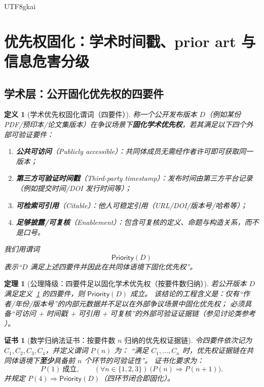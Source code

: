 \documentclass[12pt]{article}
\newtheorem{definition}{定义}[section]
\newtheorem{theorem}{定理}[section]
\newtheorem{Certificate}{证书}[section]
\begin{document}
\begin{CJK*}{UTF8}{gkai}
\section{优先权固化：学术时间戳、prior art 与信息危害分级}
\label{sec:priority-ip-infohazard}

\subsection{学术层：公开固化优先权的四要件}
\label{sec:priority-academic}

\begin{definition}[学术优先权固化谓词（四要件）]
\label{def:priority-four-conditions}
称一个公开发布版本 $D$（例如某份 PDF/预印本/论文集版本）在争议场景下\textbf{固化学术优先权}，若其满足以下四个外部可验证要件：
\begin{enumerate}
  \item \textbf{公共可访问}（Publicly accessible）：共同体成员无需经作者许可即可获取同一版本；
  \item \textbf{第三方可验证时间戳}（Third-party timestamp）：发布时间由第三方平台记录（例如提交时间/DOI 发行时间等）；
  \item \textbf{可检索可引用}（Citable）：他人可稳定引用（URL/DOI/版本号/哈希等）；
  \item \textbf{足够披露/可复核}（Enablement）：包含可复核的定义、命题与构造关系，而不是口号。
\end{enumerate}
我们用谓词
\[
  \mathsf{Priority}(D)
\]
表示“$D$ 满足上述四要件并因此在共同体语境下固化优先权”。
\end{definition}

\begin{theorem}[公理降级：四要件足以固化学术优先权（按要件数归纳）]
\label{thm:priority-four-conditions-sufficient}
若公开版本 $D$ 满足定义~\ref{def:priority-four-conditions} 的四要件，则 $\mathsf{Priority}(D)$ 成立。
该结论的工程含义是：仅有“作者/年份/版本号”的内部元数据并不足以在外部争议场景中固化优先权；
必须具备“可访问 + 时间戳 + 可引用 + 可复核”的外部可验证证据链（参见讨论类参考 \cite{ref_academia_priority}）。
\end{theorem}

\begin{Certificate}[数学归纳法证书：按要件数 $n$ 归纳的优先权证据链]
\label{cert:priority-four-conditions-sufficient}
令四要件依次记为 $C_1,C_2,C_3,C_4$，并定义谓词 $P(n)$ 为：
“满足 $C_1,\dots,C_n$ 时，优先权证据链在共同体语境下\textbf{至少}具备前 $n$ 个环节的可验证性”。
证书化要求为：
\[
  P(1)\ \text{成立},\qquad
  (\forall n\in\{1,2,3\})\ \bigl(P(n)\Rightarrow P(n+1)\bigr).
\]
并规定 $P(4)\Rightarrow \mathsf{Priority}(D)$（四环节闭合即固化）。
\end{Certificate}


\end{CJK*}
\end{document}

